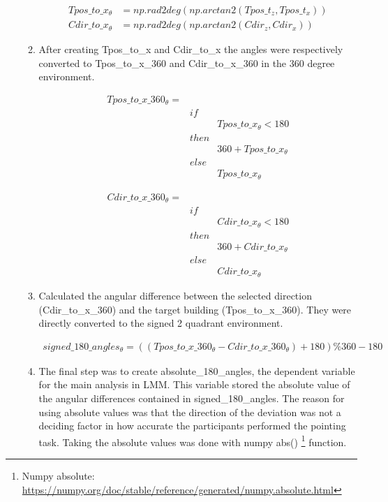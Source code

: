 \begin{enumerate}
\begin{enumerate}
		\begin{align*}
			Tpos\_to\_x_{\theta} & = np.rad2deg(np.arctan2(Tpos\_t_{z}, Tpos\_t_{x})) \\
			Cdir\_to\_x_{\theta} & = np.rad2deg(np.arctan2(Cdir_{z}, Cdir_{x}))
		\end{align*}
		
		\item After creating {\emphasize Tpos\_to\_x} and {\emphasize Cdir\_to\_x} the angles were respectively converted to {\emphasize Tpos\_to\_x\_360} and {\emphasize Cdir\_to\_x\_360} in the 360 degree environment.

		\begin{align*}
			Tpos\_to\_x\_360_{\theta} = & \\
			& if & \\
			&& Tpos\_to\_x_{\theta} < 180 \\
			& then & \\
			&& 360 + Tpos\_to\_x_{\theta} \\
			& else & \\
			&& Tpos\_to\_x_{\theta}
		\end{align*}
	
		\begin{align*}
			Cdir\_to\_x\_360_{\theta} = & \\
			& if & \\
			&& Cdir\_to\_x_{\theta} < 180 \\
			& then & \\
			&& 360 + Cdir\_to\_x_{\theta} \\
			& else & \\
			&& Cdir\_to\_x_{\theta}
		\end{align*}
		
		\item Calculated the angular difference between the selected direction {\emphasize (Cdir\_to\_x\_360)} and the target building {\emphasize (Tpos\_to\_x\_360)}. They were directly converted to the signed 2 quadrant environment.
		
		\begin{align*}
			signed\_180\_angles_{\theta} = ((Tpos\_to\_x\_360_{\theta} - Cdir\_to\_x\_360_{\theta}) + 180) \% 360 - 180
		\end{align*}
	
		\item The final step was to create {\emphasize absolute\_180\_angles}, the dependent variable for the main analysis in LMM. This variable stored the absolute value of the angular differences contained in {\emphasize signed\_180\_angles}. The reason for using absolute values was that the direction of the deviation was not a deciding factor in how accurate the participants performed the pointing task. Taking the absolute values was done with numpy abs() \footnote{Numpy absolute: \href{https://numpy.org/doc/stable/reference/generated/numpy.absolute.html}{https://numpy.org/doc/stable/reference/generated/numpy.absolute.html}} function.
		

\end{enumerate}
\end{enumerate}
